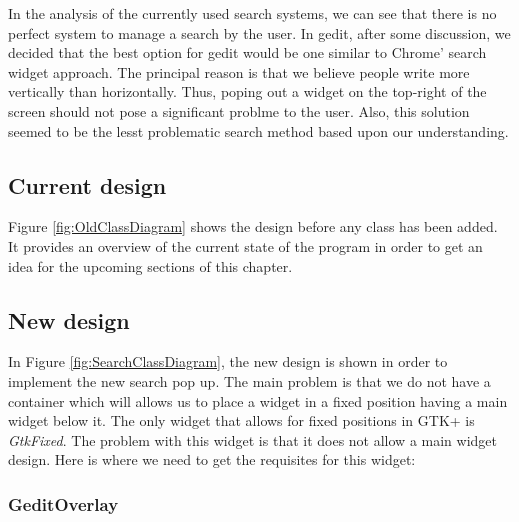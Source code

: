 
In the analysis of the currently used search systems, we can see that there is no perfect system to manage a search by the user. In gedit, after some discussion, we decided that the best option for gedit would be one similar to Chrome' search widget approach.  The principal reason is that we believe people write more vertically than horizontally.  Thus, poping out a widget on the top-right of the screen should not pose a significant problme to the user. Also, this solution seemed to be the lesst problematic search method based upon our understanding.

\subsection{Current design}

Figure \ref{fig:OldClassDiagram} shows the design before any class has been added. It provides an overview of the current state of the program in order to get an idea for the upcoming sections of this chapter.


\subsection{New design}

In Figure \ref{fig:SearchClassDiagram}, the new design is shown in order to implement the new search pop up. The main problem is that we do not have a container which will allows us to place a widget in a fixed position having a main widget below it. The only widget that allows for fixed positions in GTK+ is \emph{GtkFixed}.   The problem with this widget is that it does not allow a main widget design. Here is where we need to get the requisites for this widget:

\subsubsection{GeditOverlay}

